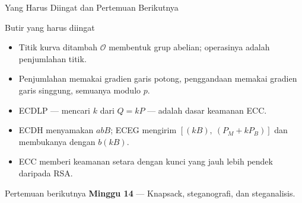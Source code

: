 \documentclass[aspectratio=169,11pt]{beamer}
\begin{document}
\begin{frame}{Yang Harus Diingat dan Pertemuan Berikutnya}
    \begin{block}{Butir yang harus diingat}
        \footnotesize
        \begin{itemize}
            \item Titik kurva ditambah $\mathcal{O}$ membentuk grup abelian;
                  operasinya adalah penjumlahan titik.
            \item Penjumlahan memakai gradien garis potong, penggandaan
                  memakai gradien garis singgung, semuanya modulo $p$.
            \item ECDLP --- mencari $k$ dari $Q=kP$ --- adalah dasar keamanan
                  ECC.
            \item ECDH menyamakan $abB$; ECEG mengirim
                  $\left[(kB),\ (P_M+kP_B)\right]$ dan membukanya dengan
                  $b(kB)$.
            \item ECC memberi keamanan setara dengan kunci yang jauh lebih
                  pendek daripada RSA.
        \end{itemize}
    \end{block}
    \vspace{0.1cm}
    \begin{exampleblock}{Pertemuan berikutnya}
        \textbf{Minggu 14} --- Knapsack, steganografi, dan steganalisis.
    \end{exampleblock}
\end{frame}
\end{document}
